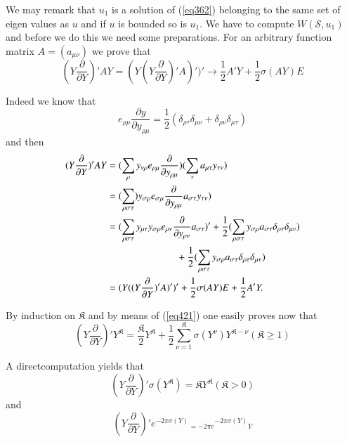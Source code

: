 We may remark that $u_1$ is a solution of (\ref{eq362}) belonging to the
same set of eigen values as $u$ and if $u$ is bounded so is $u_1$. We
\pageoriginale have to compute $ W(\mathscr{S}, u_1)$ and before we do
this we need some preparations. For an arbitrary function matrix $A =
(a _{\mu   \nu})$ we prove that    
\begin{equation*}
(Y \frac{\partial} {\partial Y})' A Y = (Y(Y \frac{\partial}{\partial
    Y})'A)')' \to \frac{1}{2} A' Y + \frac{1}{2} \sigma (A Y) E
  \tag{421}\label{eq421} 
\end{equation*}

Indeed we know that 
$$
e_{\rho \mu} \frac{\partial y} {\partial y _{\rho \mu}} =\frac{1}{2}
(\delta _{\rho \tau} \delta_{\mu \nu} + \delta_{\rho \nu} \delta_{\mu
  \tau}) 
$$
and then 
\begin{align*}
(Y\frac{\partial} {\partial Y})' A Y  & = (\sum_\rho y_{\nu \rho} e
  _{\rho \mu} \frac{\partial}{\partial y_{\rho \mu}}) (\sum_ \tau a
  _{\mu \tau} y_{\tau \nu})\\ 
& = (\sum_{\rho \sigma \tau}) y_{\sigma \rho} e_{\sigma \mu}
  \frac{\partial}{\partial y_{\rho \mu}} a _{ \sigma \tau} y _{\tau
    \nu})\\ 
& = (\sum_{\rho \sigma \tau} y_{\mu \tau} y_{\sigma \rho} e_{\rho \nu}
  \frac{\partial}{\partial y_{\rho \nu}} a_{\sigma \tau})' +
  \frac{1}{2} (\sum_{\rho \sigma \tau} y_{\sigma \rho} a_{\sigma \tau}
  \delta_{\rho \tau} \delta_{\mu \nu})\\
& \hspace{2.5cm}  + \frac{1}{2} (\sum_{\rho
    \sigma \tau} y_{\sigma \rho} a_{\sigma \tau} \delta_{\rho \tau}
  \delta_{\mu \nu})\\ 
& = (Y((Y \frac{\partial} {\partial Y})'A)')' + \frac{1}{2} \sigma (A
  Y) E + \frac{1}{2} A'Y. 
\end{align*}

By induction on $\mathfrak{K}$ and by means of (\ref{eq421}) one easily
proves now that 
\begin{equation*}
(Y \frac{\partial}{\partial Y})'Y^\mathfrak{K} = \frac{\mathfrak{K}} {2}
  Y^\mathfrak{K} + \frac{1}{2} \sum^\mathfrak{K}_{\nu = 1} \sigma
  (Y^\nu) Y ^{\mathfrak{K}-\nu} (\mathfrak{K} \ge 1) \tag{422}\label{eq422} 
\end{equation*}

A direct\pageoriginale computation yields that
\begin{equation*}
(Y \frac{\partial}{\partial Y})' \sigma (Y^\mathfrak{K}) = \mathfrak{K}
  Y^\mathfrak{K} (\mathfrak{K} > 0 ) \tag{423}\label{eq423} 
\end{equation*}
and
\begin{equation*}
(Y \frac{\partial}{\partial Y})' e^{-2 \pi \sigma (Y)}{_{= -2 \pi
      e}}{^{-2 \pi \sigma (Y)}}_Y \tag{424}\label{eq424} 
\end{equation*}

